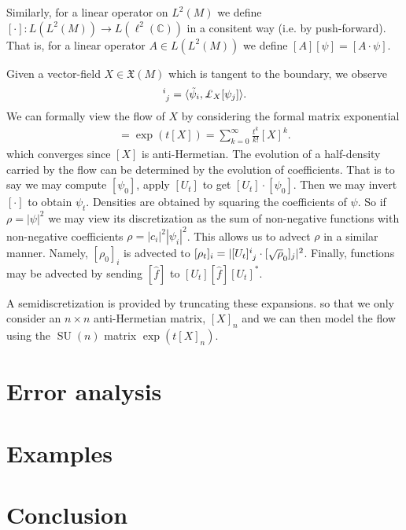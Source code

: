 \documentclass[12pt]{amsart}
\newcommand{\ram}[1]{\todo[inline, color=blue!20]{RAM: #1}}
\DeclareMathOperator{\SU}{SU}
\begin{document}
Similarly, for a linear operator on $L^2(M)$ we define $[\cdot ]: L( L^2(M)) \to L( \ell^2( \mathbb{C}) )$ in a consitent way (i.e. by push-forward).  That is, for a linear operator $A \in L( L^2 (M))$ we define $[A] [\psi] = [A \cdot \psi]$. 

Given a vector-field $X \in \mathfrak{X}(M)$ which is tangent to the
boundary, we observe
\begin{align*}
  [X]\indices{^i_j} = \langle \tilde{\psi}_i , \pounds_X[ \psi_j ] \rangle.
\end{align*}
We can formally view the flow of $X$ by considering the formal
matrix exponential
\begin{align*}
  [U_t] = \exp( t[X] ) = \sum_{k=0}^{\infty} \frac{t^k}{k!} [X]^k.
\end{align*}
which converges since $[X]$ is anti-Hermetian.
The evolution of a half-density carried by the flow can be determined by the evolution of coefficients.
That is to say we may compute $[\psi_0]$, apply $[U_t]$ to get $[U_t] \cdot [\psi_0]$.
Then we may invert $[\cdot]$ to obtain $\psi_t$.
Densities are obtained by squaring the coefficients of $\psi$.
So if $\rho = |\psi|^2$ we may view its discretization as the sum of non-negative functions with non-negative coefficients $\rho = |c_i|^2 |\psi_i|^2$.
This allows us to advect $\rho$ in a similar manner.
Namely, $[\rho_0]_i$ is advected to $[\rho_t]_i = | [U_t]\indices{^i_j} \cdot [\sqrt{\rho}_0]_j |^2$.
Finally, functions may be advected by sending $[\hat{f}]$ to $[U_t] [\hat{f}] [U_t]^*$.

A semidiscretization is provided by truncating these expansions.
so that we only consider an $n \times n$ anti-Hermetian matrix, $[X]_n$
and we can then model the flow using the $\SU(n)$ matrix $\exp( t [X]_n)$.



\section{Error analysis}
\label{sec:error}

\ram{I writes this}

\section{Examples}
\label{sec:examples}


\section{Conclusion}
\label{sec:conclusion}
\end{document}
